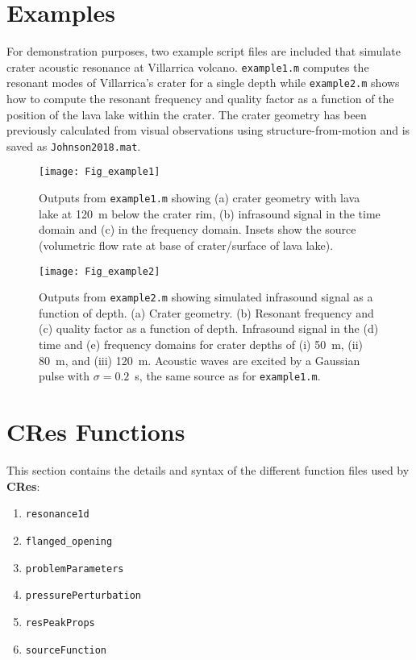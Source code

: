 \documentclass[10pt]{article}
\begin{document}
\newpage
\section{Examples}

For demonstration purposes, two example script files are included that simulate crater acoustic resonance at Villarrica volcano. \texttt{example1.m} computes the resonant modes of Villarrica's crater for a single depth while \texttt{example2.m} shows how to compute the resonant frequency and quality factor as a function of the position of the lava lake within the crater. The crater geometry has been previously calculated from visual observations using structure-from-motion \citep{Johnson2018} and is saved as \texttt{Johnson2018.mat}.

\begin{figure}[h!]
\centering
\texttt{[image: Fig\_example1]}
\caption{Outputs from \texttt{example1.m} showing (a) crater geometry with lava lake at 120~m below the crater rim, (b) infrasound signal in the time domain and (c) in the frequency domain. Insets show the source (volumetric flow rate at base of crater/surface of lava lake).}
\end{figure}

\begin{figure}[h!]
\centering
\texttt{[image: Fig\_example2]}
\caption{Outputs from \texttt{example2.m} showing simulated infrasound signal as a function of depth. (a) Crater geometry. (b) Resonant frequency and (c) quality factor as a function of depth. Infrasound signal in the (d) time and (e) frequency domains for crater depths of (i) 50~m, (ii) 80~m, and (iii) 120~m. Acoustic waves are excited by a Gaussian pulse with $\sigma=0.2$~s, the same source as for \texttt{example1.m}.}
\end{figure}


\newpage
\section{{\bf CRes} Functions}
This section contains the details and syntax of the different function files used by {\bf CRes}:
\begin{enumerate}[label=\roman*]
\item \texttt{resonance1d}
\item \texttt{flanged\_opening}
\item \texttt{problemParameters}
\item \texttt{pressurePerturbation}
\item \texttt{resPeakProps}
\item \texttt{sourceFunction}
\end{enumerate}
\end{document}
